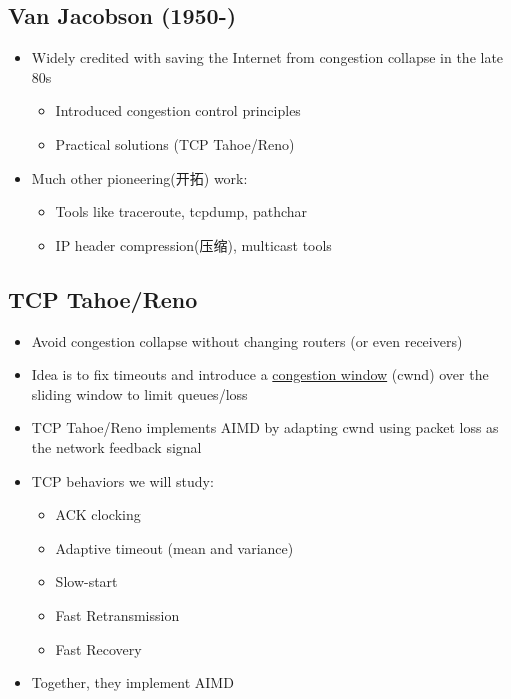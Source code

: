 \documentclass[12pt]{ctexart}   %
\begin{document}
	\subsection{Van Jacobson (1950-)}
	\begin{itemize}
		\item Widely credited with saving the Internet from congestion collapse in the late 80s
		\begin{itemize}
			\item Introduced congestion control principles
			\item Practical solutions (TCP Tahoe/Reno)
		\end{itemize}
		
		\item Much other pioneering(开拓) work:
		\begin{itemize}
			\item Tools like traceroute, tcpdump, pathchar
			\item IP header compression(压缩), multicast tools
		\end{itemize}
	\end{itemize}
	
	\subsection{TCP Tahoe/Reno}
	\begin{itemize}
		\item Avoid congestion collapse without changing routers (or even receivers)
		\item Idea is to fix timeouts and introduce a \underline{congestion window} (cwnd) over the sliding window to limit queues/loss
		\item TCP Tahoe/Reno implements AIMD by adapting cwnd using packet loss as the network feedback signal
		
		\item TCP behaviors we will study:
		\begin{itemize}
			\item ACK clocking
			\item Adaptive timeout (mean and variance)
			\item Slow-start
			\item Fast Retransmission
			\item Fast Recovery
		\end{itemize}
		
		\item Together, they implement AIMD
	\end{itemize}
	
\end{document}
